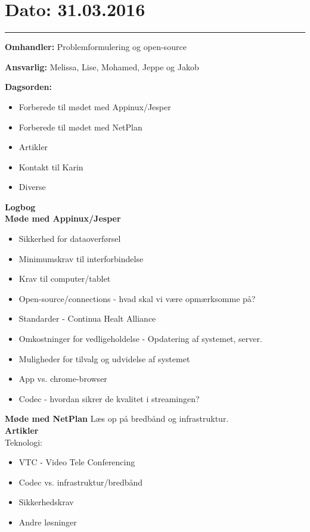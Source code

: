 \section{Dato: 31.03.2016}
\hrule

\textbf{Omhandler:} Problemformulering og open-source

\textbf{Ansvarlig:} Melissa, Lise, Mohamed, Jeppe og Jakob

\textbf{Dagsorden:}
\begin{itemize}
	\item Forberede til mødet med Appinux/Jesper
	\item Forberede til mødet med NetPlan
	\item Artikler
	\item Kontakt til Karin
	\item Diverse
\end{itemize}

\textbf{Logbog}
\\

\textbf{Møde med Appinux/Jesper}
\begin{itemize}
	\item Sikkerhed for dataoverførsel
	\item Minimumskrav til interforbindelse 
	\item Krav til computer/tablet
	\item Open-source/connections - hvad skal vi være opmærksomme på?
	\item Standarder - Continua Healt Alliance
	\item Omkostninger for vedligeholdelse - Opdatering af systemet, server.
	\item Muligheder for tilvalg og udvidelse af systemet
	\item App vs. chrome-browser
	\item Codec - hvordan sikrer de kvalitet i streamingen?
\end{itemize}


\textbf{Møde med NetPlan}
Læs op på bredbånd og infrastruktur.\\

\textbf{Artikler}\\
Teknologi:
\begin{itemize}
	\item VTC - Video Tele Conferencing
	\item Codec vs. infrastruktur/bredbånd
	\item Sikkerhedskrav
	\item Andre løsninger
\end{itemize}

